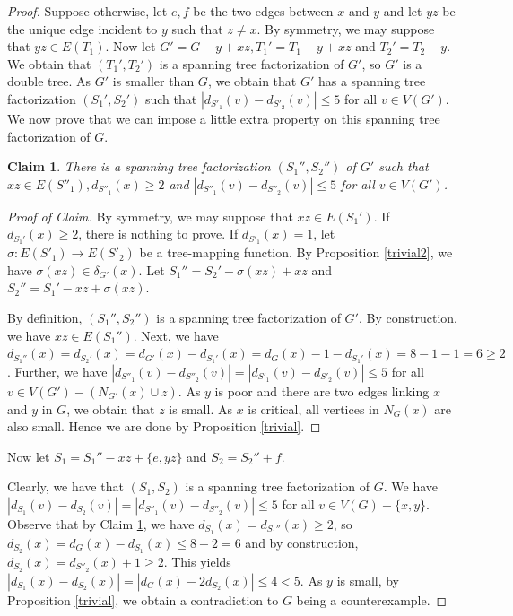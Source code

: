 \documentclass{article}
\theoremstyle{plain}
\newtheorem{Claim}{Claim}
\theoremstyle{nonumberplain}
\theoremstyle{nonumberplain}
\newcommand{\stf}{spanning tree factorization }
\begin{document}
\begin{proof}
Suppose otherwise, let $e,f$ be the two edges between $x$ and $y$ and let $yz$ be the unique edge incident to $y$ such that $z \neq x$. By symmetry, we may suppose that $yz \in E(T_1)$. Now let $G'=G-y+xz, T_1'=T_1-y+xz$ and $T_2'=T_2-y$.  We obtain that $(T_1',T_2')$ is a \stf of $G'$, so $G'$ is a double tree. As $G'$ is smaller than $G$, we obtain that $G'$ has a \stf $(S_1',S_2')$ such that $|d_{S'_1}(v)-d_{S'_2}(v)|\leq 5$ for all $v \in V(G')$. We now prove that we can impose a little extra property on this \stf of $G$.
\begin{Claim}\label{trdft}
There is a \stf $(S_1'',S_2'')$ of $G'$ such that $xz \in E(S''_1), d_{S''_1}(x)\geq 2$ and $|d_{S''_1}(v)-d_{S''_2}(v)|\leq 5$ for all $v \in V(G')$.
\end{Claim}
\begin{proof}[Proof of Claim]
 By symmetry, we may suppose that $xz \in E(S_1')$. If $d_{S_1'}(x)\geq 2$, there is nothing to prove. If $d_{S'_1}(x)=1$, let $\sigma:E(S'_1)\rightarrow E(S'_2)$ be a tree-mapping function. By Proposition \ref{trivial2}, we have $\sigma(xz) \in \delta_{G'}(x)$. Let $S_1''=S_2'-\sigma(xz)+xz$ and  $S_2''=S_1'-xz+\sigma(xz)$.

 By definition, $(S_1'',S_2'')$ is a \stf of $G'$. By construction, we have $xz \in E(S_1'')$. Next, we have  $d_{S_1''}(x)=d_{S_2'}(x)=d_{G'}(x)-d_{S_1'}(x)=d_{G}(x)-1-d_{S_1'}(x)=8-1-1=6\geq 2$. Further, we have $|d_{S''_1}(v)-d_{S''_2}(v)|=|d_{S'_1}(v)-d_{S'_2}(v)|\leq 5$ for all $v \in V(G')-(N_{G'}(x) \cup z)$. As $y$ is poor and there are two edges linking $x$ and $y$ in $G$, we obtain that $z$ is small. As $x$ is critical, all vertices in $N_G(x)$ are also small. Hence we are done by Proposition \ref{trivial}.
\renewcommand{\qedsymbol}{$\blacksquare$}
\end{proof}

Now let $S_1=S_1''-xz+\{e,yz\}$ and $S_2=S_2''+f$.

 Clearly, we have that $(S_1,S_2)$ is a \stf of $G$. We have $|d_{S_1}(v)-d_{S_2}(v)|=|d_{S''_1}(v)-d_{S''_2}(v)|\leq 5$ for all $v \in V(G)-\{x,y\}$. Observe that by Claim \ref{trdft}, we have $d_{S_1}(x)=d_{S_1''}(x)\geq 2$, so $d_{S_2}(x)= d_G(x)-d_{S_1}(x)\leq 8-2=6$ and by construction, $d_{S_2}(x)= d_{S''_2}(x)+1\geq 2$. This yields $|d_{S_1}(x)-d_{S_2}(x)|=|d_{G}(x)-2d_{S_2}(x)| \leq 4 < 5$. As $y$ is small, by Proposition \ref{trivial}, we obtain a contradiction to $G$ being a counterexample.
\end{proof}
\end{document}
